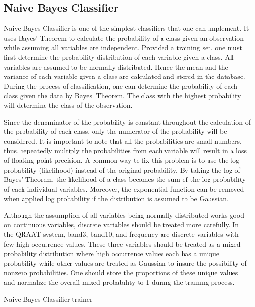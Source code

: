 \documentclass[twoside]{article}
\begin{document}
\subsection{Naive Bayes Classifier}
Naive Bayes Classifier is one of the simplest classifiers that one can implement. It uses Bayes' Theorem to calculate the probability of a class given an observation while assuming all variables are independent. Provided a training set, one must first determine the probability distribution of each variable given a class. All variables are assumed to be normally distributed. Hence the mean and the variance of each variable given a class are calculated and stored in the database. During the process of classification, one can determine the probability of each class given the data by Bayes' Theorem. The class with the highest probability will determine the class of the observation.

Since the denominator of the probability is constant throughout the calculation of the probability of each class, only the numerator of the probability will be considered. It is important to note that all the probabilities are small numbers, thus, repeatedly multiply the probabilities from each variable will result in a loss of floating point precision. A common way to fix this problem is to use the log probability (likelihood) instead of the original probability. By taking the log of Bayes' Theorem, the likelihood of a class becomes the sum of the log probability of each individual variables. Moreover, the exponential function can be removed when applied log probability if the distribution is assumed to be Gaussian.

Although the assumption of all variables being normally distributed works good on continuous variables, discrete variables should be treated more carefully. In the QRAAT system, band3, band10, and frequency are discrete variables with few high occurrence values. These three variables should be treated as a mixed probability distribution where high occurrence values each has a unique probability while other values are treated as Gaussian to insure the possibility of nonzero probabilities. One should store the proportions of these unique values and normalize the overall mixed probability to 1 during the training process. 

\IncMargin{1em}
\begin{algorithm}
\BlankLine
{}
\caption{Naive Bayes Classifier trainer}\label{NBCt}
\end{algorithm}\DecMargin{1em}
\end{document}
